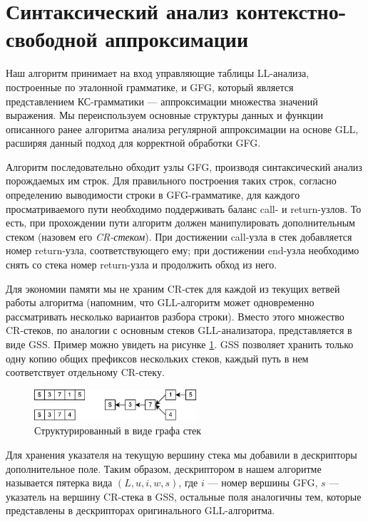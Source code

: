 \section{Синтаксический анализ контекстно-свободной аппроксимации}

Наш алгоритм принимает на вход управляющие таблицы LL-анализа, построенные по эталонной грамматике, и GFG, который является представлением КС-грамматики --- аппроксимации множества значений выражения. 
Мы переиспользуем основные структуры данных и функции описанного ранее алгоритма анализа регулярной аппроксимации на основе GLL, расширяя данный подход для корректной обработки GFG.

Алгоритм последовательно обходит узлы GFG, производя синтаксический анализ порождаемых им строк. 
Для правильного построения таких строк, согласно определению выводимости строки в GFG-грамматике, для каждого просматриваемого пути необходимо поддерживать баланс call- и return-узлов. 
То есть, при прохождении пути алгоритм должен манипулировать дополнительным стеком (назовем его \textit{CR-стеком}). 
При достижении call-узла в стек добавляется номер return-узла, соответствующего ему; при достижении end-узла необходимо снять со стека номер return-узла и продолжить обход из него. 

Для экономии памяти мы не храним CR-стек для каждой из текущих ветвей работы алгоритма (напомним, что GLL-алгоритм может одновременно рассматривать несколько вариантов разбора строки). 
Вместо этого множество CR-стеков, по аналогии с основным стеков GLL-анализатора, представляется в виде GSS. 
Пример можно увидеть на рисунке \ref{fig:gss}. GSS позволяет хранить только одну копию общих префиксов нескольких стеков, каждый путь в нем соответствует отдельному CR-стеку.

\begin{figure}[h]
	\centering
	\includegraphics[width=6cm]{pictures/gss_cr}
	\caption{Структурированный в виде графа стек}
	\label{fig:gss}
\end{figure}

Для хранения указателя на текущую вершину стека мы добавили в дескрипторы дополнительное поле. 
Таким образом, дескриптором в нашем алгоритме называется пятерка вида $(L, u, i, w, s)$, где $i$ --- номер вершины GFG, $s$ --- указатель на вершину CR-стека в GSS, остальные поля аналогичны тем, которые представлены в дескрипторах оригинального GLL-алгоритма.

